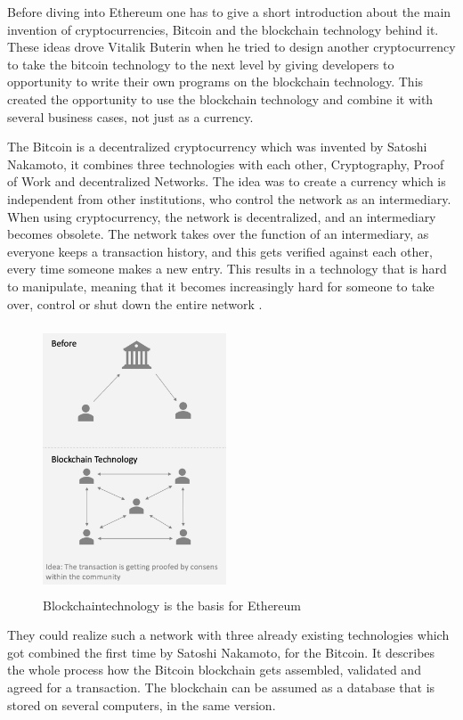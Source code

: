 Before diving into Ethereum one has to give a short introduction about the main invention of cryptocurrencies, Bitcoin and the blockchain technology behind it. 
These ideas drove Vitalik Buterin when he tried to design another cryptocurrency to take the bitcoin technology to the next level by giving developers to opportunity to write their own programs on the blockchain technology. 
This created the opportunity to use the blockchain technology and combine it with several business cases, not just as a currency. 

The Bitcoin is a decentralized cryptocurrency which was invented by Satoshi Nakamoto, it combines three technologies with each other, Cryptography, Proof of Work and decentralized Networks. The idea was to create a currency which is independent from other institutions, who control the network as an intermediary. When using cryptocurrency, the network is decentralized, and an intermediary becomes obsolete. 
The network takes over the function of an intermediary, as everyone keeps a transaction history, and this gets verified against each other, every time someone makes a new entry.
This results in a technology that is hard to manipulate, meaning that it becomes increasingly hard for someone to take over, control or shut down the entire network \cite{grishchenko2018semantic}.

\begin{figure}[ht]
\centering
\caption{Blockchaintechnology is the basis for Ethereum} 
\includegraphics[width=0.485\textwidth, height=300px]{blockchaintech}
\end{figure}

They could realize such a network with three already existing technologies which got combined the first time by Satoshi Nakamoto, for the Bitcoin. 
It describes the whole process how the Bitcoin blockchain gets assembled, validated and agreed for a transaction. 
The blockchain can be assumed as a database that is stored on several computers, in the same version\cite{grishchenko2018semantic}.

